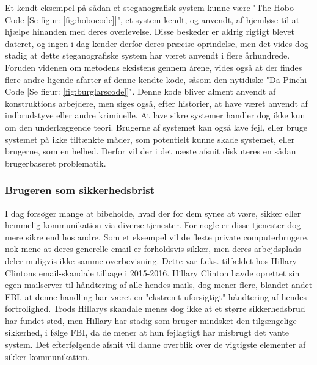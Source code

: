 Et kendt eksempel på sådan et steganografisk system kunne være "The Hobo Code [Se figur: \ref{fig:hobocode}]", et system kendt, og anvendt, af hjemløse til at hjælpe hinanden med deres overlevelse\cite{TheHoboCode}. Disse beskeder er aldrig rigtigt blevet dateret, og ingen i dag kender derfor deres præcise oprindelse, men det vides dog stadig at dette steganografiske system har været anvendt i flere århundrede.\\ 
Foruden videnen om metodens eksistens gennem årene, vides også at der findes flere andre ligende afarter af denne kendte kode, såsom den nytidiske "Da Pinchi Code [Se figur: \ref{fig:burglarscode}]". Denne kode bliver alment anvendt af konstruktions arbejdere, men siges også, efter historier, at have været anvendt af indbrudstyve eller andre kriminelle.\cite{DaPinchiCode} At lave sikre systemer handler dog ikke kun om den underlæggende teori. Brugerne af systemet kan også lave fejl, eller bruge systemet på ikke tiltænkte måder, som potentielt kunne skade systemet, eller brugerne, som en helhed. Derfor vil der i det næste afsnit diskuteres en sådan brugerbaseret problematik. 

\subsubsection{Brugeren som sikkerhedsbrist}
\label{Brugeren_som_sikkerhedsbrist}
I dag forsøger mange at bibeholde, hvad der for dem synes at være, sikker eller hemmelig kommunikation via diverse tjenester. For nogle er disse tjenester dog mere sikre end hos andre. Som et eksempel vil de fleste private computerbrugere, nok mene at deres generelle email er forholdsvis sikker, men deres arbejdsplads deler muligvis ikke samme overbevisning. Dette var f.eks. tilfældet hos Hillary Clintons email-skandale tilbage i 2015-2016.\cite{Hillary_Email_History} Hillary Clinton havde oprettet sin egen mailserver til håndtering af alle hendes mails, dog mener flere, blandet andet FBI, at denne handling har været en "ekstremt uforsigtigt" håndtering af hendes fortrolighed. Trods Hillarys skandale menes dog ikke at et større sikkerhedsbrud har fundet sted, men Hillary har stadig som bruger mindsket den tilgængelige sikkerhed, i følge FBI, da de mener at hun fejlagtigt har misbrugt det vante system.\cite{Hillary_Email_skandale} Det efterfølgende afsnit vil danne overblik over de vigtigste elementer af sikker kommunikation.

